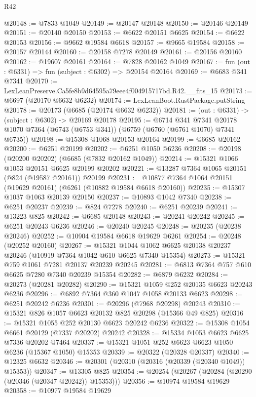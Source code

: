 \begin{lexlean}{R42}
\begin{coremodule}
{@20148 := @7833 @1049
@20149 := @20147 @20148
@20150 := @20146 @20149
@20151 := @20140 @20150
@20153 := @6622 @20151 @6625
@20154 := @6622 @20153
@20156 := @9662 @19584 @6618
@20157 := @9665 @19584
@20158 := @20157 @20144
@20160 := @20158 @7278 @20149
@20161 := @20156 @20160
@20162 := @19607 @20161
@20164 := @7828 @20162 @1049
@20167 := fun (out : @6331) => fun (subject : @6302) => @20154 @20164
@20169 := @6683 @341 @7341
@20170 := LexLeanPreserve.Ca5fe8b9d64595a79eee4f004915717bd.R42.__fits_15
@20173 := @6697 (@20170 @6632 @6232)
@20174 := LexLeanBoot.RustPackage.putString
@20178 := @20173 (@6685 (@20174 @6632 @6232))
@20181 := (out : @6331) -> (subject : @6302) -> @20169 @20178
@20195 := @6714
    @341
    @7341
    @20178
    @1070
    @7364
    (@6743 (@6753 @341))
    (@6759 (@6760 (@6761 @1070) @7341 @6735))
@20198 := @15308 @1068 @20153 @20164
@20199 := @6685 @20162
@20200 := @6251 @20199
@20202 := @6251 @1050 @6236
@20208 := @20198 (@20200 @20202) (@6685 (@7832 @20162 @1049))
@20214 := @15321 @1066 @1053 @20151 @6625 @20199 @20202
@20221 := @13287 @7364 @1065 @20151 (@824 (@19587 @20161)) @20199
@20231 := @10877 @7364 @1064 @20151 (@19629 @20161) (@6261 (@10882 @19584 @6618 @20160))
@20235 := @15307 @1037 @1063 @20139 @20150
@20237 := @10893 @1042 @7340
@20238 := @6251 @20237
@20239 := @824 @7278
@20240 := @6251 @20239
@20241 := @13223 @825
@20242 := @6685 @20148
@20243 := @20241 @20242
@20245 := @6251 @20243 @6236
@20246 := @20240 @20245
@20248 := @20235 (@20238 @20246)
@20252 := @10904 @19584 @6618 @19629 @6261
@20254 := @20248 (@20252 @20160)
@20267 := @15321 @1044 @1062 @6625 @20138 @20237 @20246 (@10919 @7364 @1042 @610 @6625 @7340 @15354)
@20273 := @15321 @759 @1061 @7281 @20137 @20239 @20245
@20281 := @6813 @7364 @757 @610 @6625 @7280 @7340 @20239 @15354
@20282 := @6879 @6232
@20284 := @20273 (@20281 @20282)
@20290 := @15321 @1059 @252 @20135 @6623 @20243 @6236
@20296 := @6892 @7364 @360 @1047 @1058 @20133 @6623
@20298 := @6251 @20242 @6236
@20301 := @20296 (@7968 @20298) @20243
@20310 := @15321 @826 @1057 @6623 @20132 @825 @20298 (@15366 @49 @825)
@20316 := @15321 @1055 @252 @20130 @6623 @20242 @6236
@20322 := @15308 @1054 @6661 @20129 (@7337 @20202) @20242
@20328 := @15334 @1053 @6623 @6625 @7336 @20202 @7464
@20337 := @15321 @1051 @252 @6623 @6623 @1050 @6236 (@15367 @1050) @15353
@20339 := @20322 (@20328 @20337)
@20340 := @12325 @6632
@20346 := @20301 (@20310 (@20316 (@20339 (@20340 @1049)) @15353))
@20347 := @13305 @825
@20354 := @20254 (@20267 (@20284 (@20290 (@20346 (@20347 @20242)) @15353)))
@20356 := @10974 @19584 @19629
@20358 := @10977 @19584 @19629
}
\end{coremodule}
\end{lexlean}
